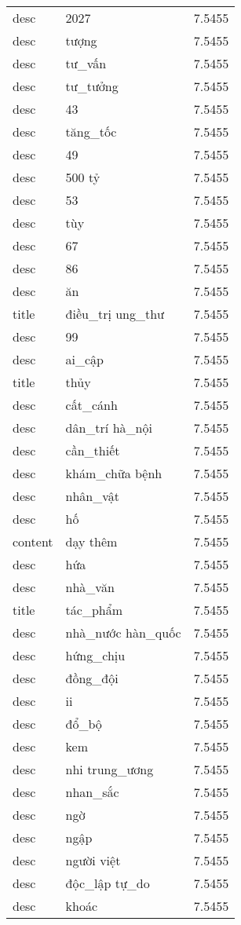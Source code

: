 \documentclass{article}
\begin{document}
\begin{tabular}{lll}
desc & 2027 & 7.5455\\
desc & tượng & 7.5455\\
desc & tư\_vấn & 7.5455\\
desc & tư\_tưởng & 7.5455\\
desc & 43 & 7.5455\\
desc & tăng\_tốc & 7.5455\\
desc & 49 & 7.5455\\
desc & 500 tỷ & 7.5455\\
desc & 53 & 7.5455\\
desc & tùy & 7.5455\\
desc & 67 & 7.5455\\
desc & 86 & 7.5455\\
desc & ăn & 7.5455\\
title & điều\_trị ung\_thư & 7.5455\\
desc & 99 & 7.5455\\
desc & ai\_cập & 7.5455\\
title & thủy & 7.5455\\
desc & cất\_cánh & 7.5455\\
desc & dân\_trí hà\_nội & 7.5455\\
desc & cần\_thiết & 7.5455\\
desc & khám\_chữa bệnh & 7.5455\\
desc & nhân\_vật & 7.5455\\
desc & hố & 7.5455\\
content & dạy thêm & 7.5455\\
desc & hứa & 7.5455\\
desc & nhà\_văn & 7.5455\\
title & tác\_phẩm & 7.5455\\
desc & nhà\_nước hàn\_quốc & 7.5455\\
desc & hứng\_chịu & 7.5455\\
desc & đồng\_đội & 7.5455\\
desc & ii & 7.5455\\
desc & đổ\_bộ & 7.5455\\
desc & kem & 7.5455\\
desc & nhi trung\_ương & 7.5455\\
desc & nhan\_sắc & 7.5455\\
desc & ngờ & 7.5455\\
desc & ngập & 7.5455\\
desc & người việt & 7.5455\\
desc & độc\_lập tự\_do & 7.5455\\
desc & khoác & 7.5455\\

\end{tabular}
\end{document}
